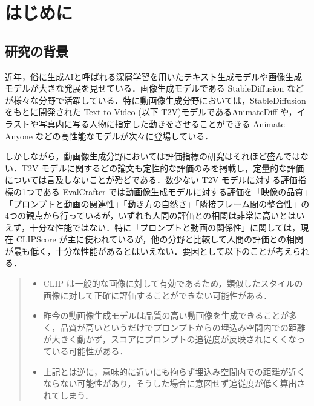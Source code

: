 \documentclass[11pt,a4j]{jreport}
\begin{document}
\tableofcontents
\listoffigures
\listoftables

\pagestyle{fancy}
\lhead{\rightmark}
\renewcommand{\chaptermark}[1]{\markboth{第\ \normalfont\thechapter\ 章~~#1}{}}

\chapter{はじめに}
\label{intro}

\section{研究の背景}

近年，俗に生成AIと呼ばれる深層学習を用いたテキスト生成モデルや画像生成モデルが大きな発展を見せている．画像生成モデルである StableDiffusion \cite{rombach2022high} などが様々な分野で活躍している．特に動画像生成分野においては，StableDiffusion をもとに開発された Text-to-Video (以下 T2V)モデルであるAnimateDiff \cite{guo2023animatediff} や，イラストや写真内に写る人物に指定した動きをさせることができる Animate Anyone \cite{hu2023animate} などの高性能なモデルが次々に登場している．

しかしながら，動画像生成分野においては評価指標の研究はそれほど盛んではない．T2V モデルに関するどの論文も定性的な評価のみを掲載し，定量的な評価については言及しないことが殆どである．数少ない T2V モデルに対する評価指標の1つである EvalCrafter \cite{liu2023evalcrafter} では動画像生成モデルに対する評価を「映像の品質」「プロンプトと動画の関連性」「動き方の自然さ」「隣接フレーム間の整合性」の4つの観点から行っているが，いずれも人間の評価との相関は非常に高いとはいえず，十分な性能ではない．特に「プロンプトと動画の関係性」に関しては，現在 CLIPScore \cite{hessel2021clipscore} が主に使われているが，他の分野と比較して人間の評価との相関が最も低く，十分な性能があるとはいえない．要因として以下のことが考えられる．

\begin{quote}\begin{itemize}
    \item CLIP \cite{radford2021clip} は一般的な画像に対して有効であるため，類似したスタイルの画像に対して正確に評価することができない可能性がある．
    \item 昨今の動画像生成モデルは品質の高い動画像を生成できることが多く，品質が高いというだけでプロンプトからの埋込み空間内での距離が大きく動かず，スコアにプロンプトの追従度が反映されにくくなっている可能性がある．
    \item 上記とは逆に，意味的に近いにも拘らず埋込み空間内での距離が近くならない可能性があり，そうした場合に意図せず追従度が低く算出されてしまう．
\end{itemize}\end{quote}
\end{document}
